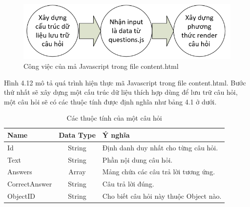 		\begin{center}
		\begin{figure}[htp]
			\begin{center}
				\includegraphics[width=15cm]{Chapter4/Pictures/picture412.png}
			\end{center}
			\caption{Công việc của mả Javascript trong file content.html}
			\label{refpicture510}
		\end{figure}
	\end{center}


Hình 4.12 mô tả quá trình hiện thực mã Javascript trong file content.html. Bước thứ nhất sẽ xây dựng một cấu trúc dữ liệu thích hợp dùng để lưu trữ câu hỏi, một câu hỏi sẽ có các thuộc tính được định nghĩa như bảng 4.1 ở dưới.\\

\begin{table}[!htp]
	\centering
	\begin{tabular}{|l|c|l|}
		\hline 
		\textbf{Name} 	& \textbf{Data Type} 	& \hspace{2.6cm}\textbf{Ý nghĩa} \\ 
		\hline 
		Id 				& String 				& Định danh duy nhất cho từng câu hỏi.\\ 
		\hline 
		Text 			& String 				& Phần nội dung câu hỏi.\\ 
		\hline 
		Answers 		& Array 				& Mảng chứa các câu trả lời tương ứng.\\ 
		\hline 
		CorrectAnswer	& String 				& Câu trả lời đúng.\\ 
		\hline
		ObjectID 		& String 				& Cho biết câu hỏi này thuộc Object nào.\\  
		\hline
	\end{tabular}
	\caption{Các thuộc tính của một câu hỏi}
	\label{reftable51}
\end{table}



